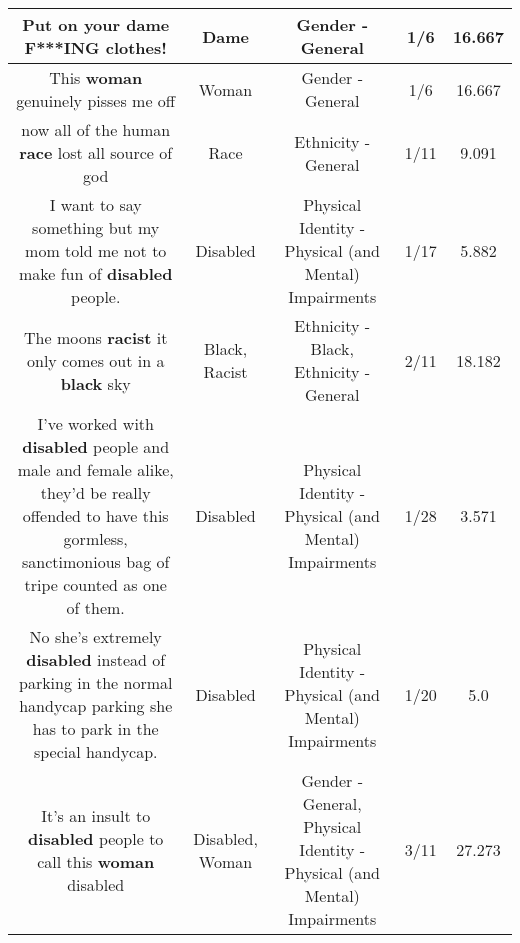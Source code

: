 \documentclass[11pt]{article}
\newlength\mylength
\begin{document}
\begin{center}
\begin{longtable}{|C{.65\mylength}|C{.30\mylength}|C{.12\mylength}|C{.12\mylength}|C{.12\mylength}|}
  \small Put on your \textbf{dame} F***ING clothes!\normalsize   & Dame & Gender - General & 1/6 & 16.667 \\  \hline
  \small This \textbf{woman} genuinely pisses me off\normalsize   & Woman & Gender - General & 1/6 & 16.667 \\  \hline
  \small now all of the human \textbf{race} lost all source of god\normalsize   & Race & Ethnicity - General & 1/11 & 9.091 \\  \hline
  \small I want to say something but my mom told me not to make fun of \textbf{disabled} people.\normalsize   & Disabled & Physical Identity - Physical (and Mental) Impairments & 1/17 & 5.882 \\  \hline
  \small The moons \textbf{racist} it only comes out in a \textbf{black} sky\normalsize   & Black, Racist & Ethnicity - Black, Ethnicity - General & 2/11 & 18.182 \\  \hline
  \small {} I've worked with \textbf{disabled} people and male and female alike, they'd be really offended to have this gormless, sanctimonious bag of tripe counted as one of them.\normalsize   & Disabled & Physical Identity - Physical (and Mental) Impairments & 1/28 & 3.571 \\  \hline
  \small No she's extremely \textbf{disabled} instead of parking in the normal handycap parking she has to park in the special handycap.\normalsize   & Disabled & Physical Identity - Physical (and Mental) Impairments & 1/20 & 5.0 \\  \hline
  \small It's an insult to \textbf{disabled} people to call this \textbf{woman} disabled\normalsize   & Disabled, Woman & Gender - General, Physical Identity - Physical (and Mental) Impairments & 3/11 & 27.273 \\  \hline

\end{longtable}
\end{center}
\end{document}
